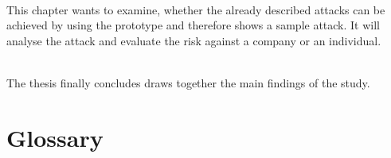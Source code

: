 \vspace{0.5em}\\
\noindent This chapter wants to examine, whether the already described attacks
can be achieved by using the prototype and therefore shows a sample attack. It
will analyse the attack and evaluate the risk against a company or an
individual.

\vspace{0.5em}\\
\noindent The thesis finally concludes draws together the main findings of the
study.

\section{Glossary}
